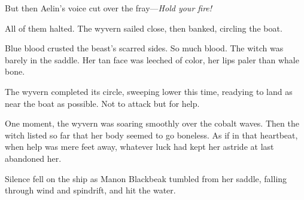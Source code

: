 But then Aelin's voice cut over the fray---\emph{Hold your fire!}

All of them halted. The wyvern sailed close, then banked, circling the boat.

Blue blood crusted the beast's scarred sides. So much blood. The witch was barely in the saddle. Her tan face was leeched of color, her lips paler than whale bone.

The wyvern completed its circle, sweeping lower this time, readying to land as near the boat as possible. Not to attack  but for help.

One moment, the wyvern was soaring smoothly over the cobalt waves. Then the witch listed so far that her body seemed to go boneless. As if in that heartbeat, when help was mere feet away, whatever luck had kept her astride at last abandoned her.

Silence fell on the ship as Manon Blackbeak tumbled from her saddle, falling through wind and spindrift, and hit the water.
